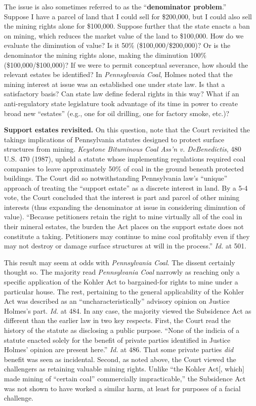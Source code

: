 The issue is also sometimes referred to as the ``\textbf{denominator problem}.''
Suppose I have a parcel of land that I could sell for \$200,000, but I could
also sell the mining rights alone for \$100,000. Suppose further that the state
enacts a ban on mining, which reduces the market value of the land to \$100,000.
How do we evaluate the diminution of value? Is it 50\% (\$100,000/\$200,000)? Or
is the denominator the mining rights alone, making the diminution 100\%
(\$100,000/\$100,000)? If we were to permit conceptual severance, how should the
relevant estates be identified? In \textit{Pennsylvania Coal}, Holmes noted that
the mining interest at issue was an established one under state law. Is that a
satisfactory basis? Can state law define federal rights in this way? What if an
anti-regulatory state legislature took advantage of its time in power to create
broad new ``estates'' (e.g., one for oil drilling, one for factory smoke, etc.)?


\item \textbf{Support estates revisited.} On this question, note that the Court
revisited the takings implications of Pennsylvania statutes designed to protect
surface structures from mining. \textit{Keystone Bituminous Coal Ass'n v.
DeBenedictis}, 480 U.S. 470 (1987), upheld a statute whose implementing
regulations required coal companies to leave approximately 50\% of coal in the
ground beneath protected buildings. The Court did so notwithstanding
Pennsylvania law's ``unique'' approach of treating the ``support estate'' as a
discrete interest in land. By a 5-4 vote, the Court concluded that the interest
is part and parcel of other mining interests (thus expanding the denominator at
issue in considering diminution of value). ``Because petitioners retain the
right to mine virtually all of the coal in their mineral estates, the burden the
Act places on the support estate does not constitute a taking. Petitioners may
continue to mine coal profitably even if they may not destroy or damage surface
structures at will in the process.'' \textit{Id.} at 501. 


This result may seem at odds with \textit{Pennsylvania Coal}. The dissent
certainly thought so. The majority read \textit{Pennsylvania Coal} narrowly as
reaching only a specific application of the Kohler Act to bargained-for rights
to mine under a particular house. The rest, pertaining to the general
applicability of the Kohler Act was described as an ``uncharacteristically''
advisory opinion on Justice Holmes's part. \textit{Id.} at 484. In any case, the
majority viewed the Subsidence Act as different than the earlier law in two key
respects. First, the Court read the history of the statute as disclosing a
public purpose. ``None of the indicia of a statute enacted solely for the
benefit of private parties identified in Justice Holmes' opinion are present
here.'' \textit{Id.} at 486. That some private parties \textit{did} benefit was
seen as incidental. Second, as noted above, the Court viewed the challengers as
retaining valuable mining rights. Unlike ``the Kohler Act[, which] made mining
of ``certain coal'' commercially impracticable,'' the Subsidence Act was not
shown to have worked a similar harm, at least for purposes of a facial
challenge.



